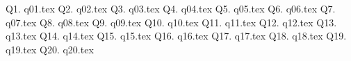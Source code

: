 

\newcommand\myincludetex[1]{\textbox{{\scriptsize \texttt{#1}}}

    
}

\newcommand\myincludesrc[1]{\textbox{{\scriptsize \texttt{#1}}}
    
    \VerbatimInput[fontsize=\footnotesize,frame=single]{#1}
}


\newpage 
\newpage Q1. {q01.tex}
\newpage Q2. {q02.tex}
\newpage Q3. {q03.tex}
\newpage Q4. {q04.tex}
\newpage Q5. {q05.tex}
\newpage Q6. {q06.tex}
\newpage Q7. {q07.tex}
\newpage Q8. {q08.tex}
\newpage 
\newpage Q9. {q09.tex}
\newpage Q10. {q10.tex}
\newpage Q11. {q11.tex}
\newpage Q12. {q12.tex}
\newpage Q13. {q13.tex}
\newpage Q14. {q14.tex}
\newpage 
\newpage Q15. {q15.tex}
\newpage Q16. {q16.tex}
\newpage Q17. {q17.tex}
\newpage Q18. {q18.tex}
\newpage Q19. {q19.tex}
\newpage Q20. {q20.tex}
\newpage 


    
